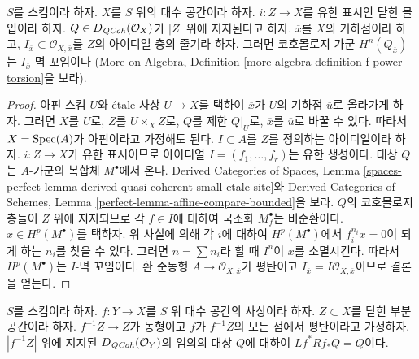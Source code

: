 \begin{lemma}
\label{lemma-stalk-of-module-with-support}
$S$를 스킴이라 하자. $X$를 $S$ 위의 대수 공간이라 하자.
$i : Z \to X$를 유한 표시인 닫힌 몰입이라 하자.
$Q \in D_{\mathit{QCoh}}(\mathcal{O}_X)$가 $|Z|$ 위에 지지된다고 하자.
$\overline{x}$를 $X$의 기하점이라 하고,
$I_{\overline{x}} \subset \mathcal{O}_{X, \overline{x}}$를 $Z$의
아이디얼 층의 줄기라 하자. 그러면 코호몰로지 가군
$H^n(Q_{\overline{x}})$는 $I_{\overline{x}}$-멱 꼬임이다
(More on Algebra, Definition
\ref{more-algebra-definition-f-power-torsion}을 보라).
\end{lemma}

\begin{proof}
아핀 스킴 $U$와 \'etale 사상 $U \to X$를 택하여
$\overline{x}$가 $U$의 기하점 $\overline{u}$로 올라가게 하자.
그러면 $X$를 $U$로, $Z$를 $U \times_X Z$로, $Q$를 제한
$Q|_U$로, $\overline{x}$를 $\overline{u}$로 바꿀 수 있다.
따라서 $X = \mathop{\mathrm{Spec}}(A)$가 아핀이라고 가정해도 된다.
$I \subset A$를 $Z$를 정의하는 아이디얼이라 하자.
$i : Z \to X$가 유한 표시이므로 아이디얼
$I = (f_1, \ldots, f_r)$는 유한 생성이다. 대상 $Q$는 $A$-가군의
복합체 $M^\bullet$에서 온다. Derived Categories of Spaces, Lemma
\ref{spaces-perfect-lemma-derived-quasi-coherent-small-etale-site}와
Derived Categories of Schemes, Lemma
\ref{perfect-lemma-affine-compare-bounded}을 보라.
$Q$의 코호몰로지 층들이 $Z$ 위에 지지되므로 각 $f \in I$에 대하여
국소화 $M^\bullet_f$는 비순환이다. $x \in H^p(M^\bullet)$를 택하자.
위 사실에 의해 각 $i$에 대하여 $H^p(M^\bullet)$에서
$f_i^{n_i}x = 0$이 되게 하는 $n_i$를 찾을 수 있다.
그러면 $n = \sum n_i$라 할 때 $I^n$이 $x$를 소멸시킨다.
따라서 $H^p(M^\bullet)$는 $I$-멱 꼬임이다. 환 준동형
$A \to \mathcal{O}_{X, \overline{x}}$가 평탄이고
$I_{\overline{x}} = I\mathcal{O}_{X, \overline{x}}$이므로 결론을 얻는다.
\end{proof}

\begin{lemma}
\label{lemma-formal-glueing-on-closed}
$S$를 스킴이라 하자. $f : Y \to X$를 $S$ 위 대수 공간의 사상이라 하자.
$Z \subset X$를 닫힌 부분공간이라 하자. $f^{-1}Z \to Z$가 동형이고
$f$가 $f^{-1}Z$의 모든 점에서 평탄이라고 가정하자.
$|f^{-1}Z|$ 위에 지지된 $D_{\mathit{QCoh}}(\mathcal{O}_Y)$의 임의의 대상 $Q$에 대하여
$Lf^*Rf_*Q = Q$이다.
\end{lemma}


